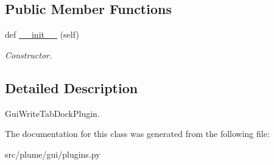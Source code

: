 \subsection*{Public Member Functions}
\begin{DoxyCompactItemize}
\item 
def \hyperlink{classplume-creator_1_1src_1_1plume_1_1gui_1_1plugins_1_1_gui_write_sub_window_dock_plugin_a4e8af54c0f10add6a61a4fa952043cbe}{\+\_\+\+\_\+init\+\_\+\+\_\+} (self)\hypertarget{classplume-creator_1_1src_1_1plume_1_1gui_1_1plugins_1_1_gui_write_sub_window_dock_plugin_a4e8af54c0f10add6a61a4fa952043cbe}{}\label{classplume-creator_1_1src_1_1plume_1_1gui_1_1plugins_1_1_gui_write_sub_window_dock_plugin_a4e8af54c0f10add6a61a4fa952043cbe}

\begin{DoxyCompactList}\small\item\em Constructor. \end{DoxyCompactList}\end{DoxyCompactItemize}


\subsection{Detailed Description}
Gui\+Write\+Tab\+Dock\+Plugin. 

The documentation for this class was generated from the following file\+:\begin{DoxyCompactItemize}
\item 
src/plume/gui/plugins.\+py\end{DoxyCompactItemize}

